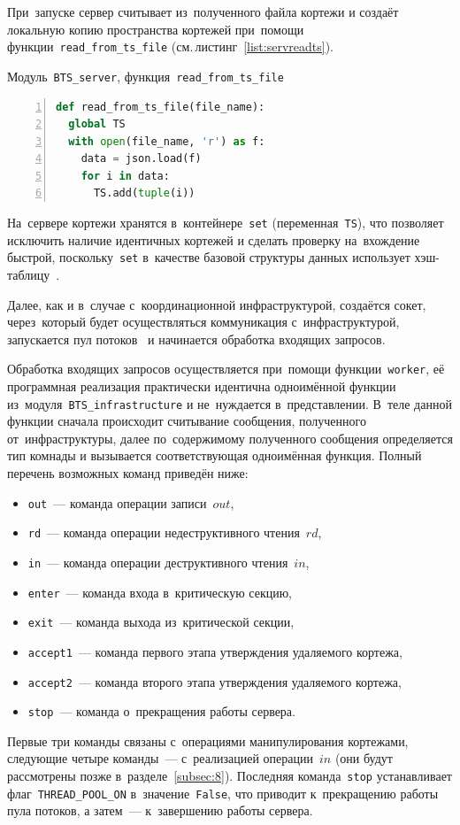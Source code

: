 При~запуске сервер считывает из~полученного файла кортежи и создаёт локальную копию пространства кортежей при~помощи функции~\texttt{read_from_ts_file} (см.\,листинг~\ref{list:servreadts}).
\begin{ListingEnv}\caption{Модуль~\texttt{BTS\_server}, функция~\texttt{read\_from\_ts\_file}}\label{list:servreadts}
	\begin{lstlisting}[language=Python, numbers=left]
def read_from_ts_file(file_name):
  global TS
  with open(file_name, 'r') as f:
    data = json.load(f)
    for i in data:
      TS.add(tuple(i))
	\end{lstlisting}
\end{ListingEnv}
На~сервере кортежи хранятся в~контейнере~\texttt{set} (переменная~\texttt{TS}), что позволяет исключить наличие идентичных кортежей и сделать проверку на~вхождение быстрой, поскольку~\texttt{set} в~качестве базовой структуры данных использует хэш-таблицу~\autocite{Gorelick}.

Далее, как и в~случае с~координационной инфраструктурой, создаётся сокет, через~который будет осуществляться коммуникация с~инфраструктурой, запускается пул потоков~\autocite{threadpool} и начинается обработка входящих запросов.

Обработка входящих запросов осуществляется при~помощи функции~\texttt{worker}, её программная реализация практически идентична одноимённой функции из~модуля~\texttt{BTS\_infrastructure} и не~нуждается в~представлении. В~теле данной функции сначала происходит считывание сообщения, полученного от~инфраструктуры, далее по~содержимому полученного сообщения определяется тип комнады и вызывается соответствующая одноимённая функция. Полный перечень возможных команд приведён ниже:
\begin{itemize}
	\item \texttt{out}~--- команда операции записи~$out$,
	\item \texttt{rd}~--- команда операции недеструктивного чтения~$rd$,
	\item \texttt{in}~--- команда операции деструктивного чтения~$in$,
	\item \texttt{enter}~--- команда входа в~критическую секцию,
	\item \texttt{exit}~--- команда выхода из~критической секции,
	\item \texttt{accept1}~--- команда первого этапа утверждения удаляемого кортежа,
	\item \texttt{accept2}~--- команда второго этапа утверждения удаляемого кортежа,
	\item \texttt{stop}~--- команда о~прекращения работы сервера.
\end{itemize}
Первые три команды связаны с~операциями манипулирования кортежами, следующие четыре команды~--- с~реализацией операции~$in$ (они будут рассмотрены позже в~разделе~\ref{subsec:8}). Последняя команда~\texttt{stop} устанавливает флаг~\texttt{THREAD_POOL_ON} в~значение~\texttt{False}, что приводит к~прекращению работы пула потоков, а затем~--- к~завершению работы сервера.


